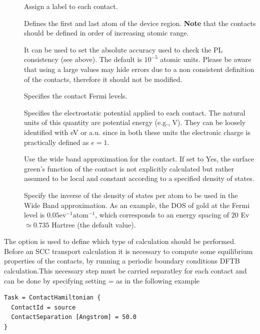 \begin{description}
\item[] Assign a label to each contact. 
\item[] \label{AtomRange} Defines the first and last atom of the
  device region.  {\bf Note} that the contacts should be defined in order of
  increasing atomic range.

\item[] It can be used to set the
  absolute accuracy used to check the PL consistency (see above). The default is
  $10^{-5}$ atomic units. Please be aware that using a large values may hide
  errors due to a non consistent definition of the contacts, therefore it should
  not be modified.
  \item[] Specifies the contact Fermi
    levels.
  \item[] Specifies the electrostatic
    potential applied to each contact. The natural units of this quantity are
    potential energy (e.g., V). They can be loosely identified with eV or
    a.u. since in both these units the electronic charge is practically defined
    as $e=1$.
  \item[] Use the wide band approximation for the contact. If set
    to Yes, the surface green's function of the contact is not explicitly
    calculated but rather assumed to be local and constant according to a
    specified density of states.
  \item[] Specify the inverse of the
    density of states per atom to be used in the Wide Band approximation. As an
    example, the DOS of gold at the Fermi level is $0.05
    \mathrm{ev}^{-1}\mathrm{atom}^{-1}$, which corresponds to an energy spacing
    of $20$ Ev $ \simeq 0.735$ Hartree (the default value).
\end{description}

 \label{Task} The  option is
used to define which type of calculation should be performed. Before an SCC
transport calculation it is necessary to compute some equilibrium properties of
the contacts, by running a periodic boundary conditions DFTB calculation.This
necessary step must be carried separatley for each contact and can be done by
specifying setting = as in the following example

\begin{verbatim}
Task = ContactHamiltonian {
  ContactId = source
  ContactSeparation [Angstrom] = 50.0 
}
\end{verbatim}

